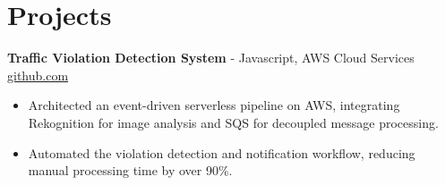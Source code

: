 \documentclass[11pt]{article}       %
\begin{document}

\vspace{-18.5pt}

\section*{Projects}

\textbf{Traffic Violation Detection System}{ - Javascript, AWS Cloud Services} \hfill \href{https://github.com/Monica20030707/AWS_rekonigition-N-read-database}{github.com} \\
\vspace{-9pt}
\begin{itemize}
  \item Architected an event-driven serverless pipeline on AWS, integrating Rekognition for image analysis and SQS for decoupled message processing.
  \item Automated the violation detection and notification workflow, reducing manual processing time by over 90\%.
\end{itemize}
\end{document}
